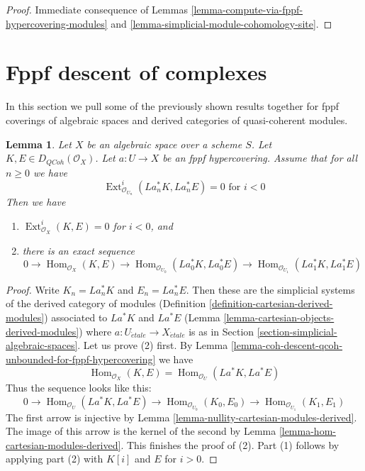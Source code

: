 \documentclass{stacks-project}
\theoremstyle{plain}
\newtheorem{lemma}[subsection]{Lemma}
\theoremstyle{definition}
\theoremstyle{remark}
\numberwithin{equation}{subsection}
\def\Hom{\mathop{\mathrm{Hom}}\nolimits}
\def\Ext{\mathop{\mathrm{Ext}}\nolimits}
\def\etale{{\acute{e}tale}}
\def\QCoh{\mathit{QCoh}}
\begin{document}
\begin{proof}
Immediate consequence of
Lemmas \ref{lemma-compute-via-fppf-hypercovering-modules}
and \ref{lemma-simplicial-module-cohomology-site}.
\end{proof}







\section{Fppf descent of complexes}
\label{section-fppf-descent-derived}

\noindent
In this section we pull some of the previously shown
results together for fppf coverings of algebraic spaces
and derived categories of quasi-coherent modules.

\begin{lemma}
\label{lemma-fppf-neg-ext-zero-hom}
Let $X$ be an algebraic space over a scheme $S$.
Let $K, E \in D_\QCoh(\mathcal{O}_X)$.
Let $a : U \to X$ be an fppf hypercovering.
Assume that for all $n \geq 0$ we have
$$
\Ext_{\mathcal{O}_{U_n}}^i(La_n^*K, La_n^*E) = 0
\text{ for } i < 0
$$
Then we have
\begin{enumerate}
\item $\Ext_{\mathcal{O}_X}^i(K, E) = 0$ for $i < 0$, and
\item there is an exact sequence
$$
0
\to
\Hom_{\mathcal{O}_X}(K, E)
\to
\Hom_{\mathcal{O}_{U_0}}(La_0^*K, La_0^*E)
\to
\Hom_{\mathcal{O}_{U_1}}(La_1^*K, La_1^*E)
$$
\end{enumerate}
\end{lemma}

\begin{proof}
Write $K_n = La_n^*K$ and $E_n = La_n^*E$. Then these are the
simplicial systems of the derived category of modules
(Definition \ref{definition-cartesian-derived-modules})
associated to $La^*K$ and $La^*E$
(Lemma \ref{lemma-cartesian-objects-derived-modules})
where $a : U_\etale \to X_\etale$ is as in
Section \ref{section-simplicial-algebraic-spaces}.
Let us prove (2) first. By
Lemma \ref{lemma-coh-descent-qcoh-unbounded-for-fppf-hypercovering}
we have
$$
\Hom_{\mathcal{O}_X}(K, E) =
\Hom_{\mathcal{O}_U}(La^*K, La^*E)
$$
Thus the sequence looks like this:
$$
0
\to
\Hom_{\mathcal{O}_U}(La^*K, La^*E)
\to
\Hom_{\mathcal{O}_{U_0}}(K_0, E_0)
\to
\Hom_{\mathcal{O}_{U_1}}(K_1, E_1)
$$
The first arrow  is injective by
Lemma \ref{lemma-nullity-cartesian-modules-derived}.
The image of this arrow is the kernel of the second
by Lemma \ref{lemma-hom-cartesian-modules-derived}.
This finishes the proof of (2).
Part (1) follows by applying part (2) with
$K[i]$ and $E$ for $i > 0$.
\end{proof}
\end{document}
